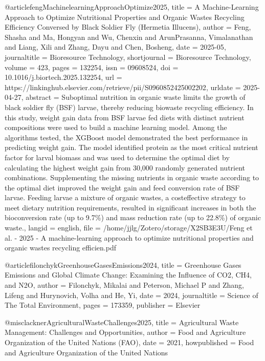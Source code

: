 {{{@article{fengMachinelearningApproachOptimize2025,
  title = {A Machine-Learning Approach to Optimize Nutritional Properties and Organic Wastes Recycling Efficiency Conversed by Black Soldier Fly ({{Hermetia}} Illucens)},
  author = {Feng, Shasha and Ma, Hongyan and Wu, Chenxin and ArunPrasanna, Vimalanathan and Liang, Xili and Zhang, Dayu and Chen, Bosheng},
  date = {2025-05},
  journaltitle = {Bioresource Technology},
  shortjournal = {Bioresource Technology},
  volume = {423},
  pages = {132254},
  issn = {09608524},
  doi = {10.1016/j.biortech.2025.132254},
  url = {https://linkinghub.elsevier.com/retrieve/pii/S0960852425002202},
  urldate = {2025-04-27},
  abstract = {Suboptimal nutrition in organic waste limits the growth of black soldier fly (BSF) larvae, thereby reducing biowaste recycling efficiency. In this study, weight gain data from BSF larvae fed diets with distinct nutrient compositions were used to build a machine learning model. Among the algorithms tested, the XGBoost model demonstrated the best performance in predicting weight gain. The model identified protein as the most critical nutrient factor for larval biomass and was used to determine the optimal diet by calculating the highest weight gain from 30,000 randomly generated nutrient combinations. Supplementing the missing nutrients in organic waste according to the optimal diet improved the weight gain and feed conversion rate of BSF larvae. Feeding larvae a mixture of organic wastes, a costeffective strategy to meet dietary nutrition requirements, resulted in significant increases in both the bioconversion rate (up to 9.7\%) and mass reduction rate (up to 22.8\%) of organic waste.},
  langid = {english},
  file = {/home/jjlg/Zotero/storage/X2SB3E3U/Feng et al. - 2025 - A machine-learning approach to optimize nutritional properties and organic wastes recycling efficien.pdf}
}

@article{filonchykGreenhouseGasesEmissions2024,
  title = {Greenhouse Gases Emissions and Global Climate Change: {{Examining}} the Influence of {{CO2}}, {{CH4}}, and {{N2O}}},
  author = {Filonchyk, Mikalai and Peterson, Michael P and Zhang, Lifeng and Hurynovich, Volha and He, Yi},
  date = {2024},
  journaltitle = {Science of The Total Environment},
  pages = {173359},
  publisher = {Elsevier}
}

@misc{lacknerAgriculturalWasteChallenges2025,
  title = {Agricultural Waste Management: {{Challenges}} and Opportunities},
  author = {{Food and Agriculture Organization of the United Nations (FAO)}},
  date = {2021},
  howpublished = {Food and Agriculture Organization of the United Nations}
}

}}}

